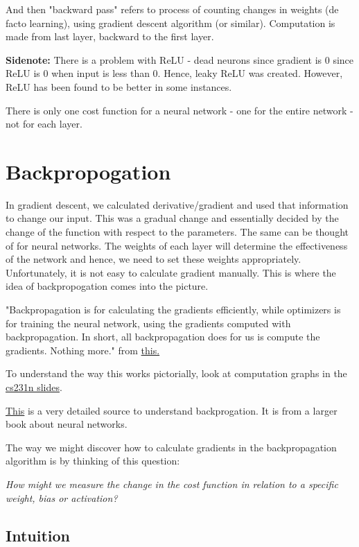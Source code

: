 And then "backward pass" refers to process of counting changes in weights (de facto learning), using gradient descent algorithm (or similar). Computation is made from last layer, backward to the first layer.

\textbf{Sidenote:} There is a problem with ReLU - dead neurons since gradient is 0 since ReLU is 0 when input is less than 0. Hence, leaky ReLU was created. However, ReLU has been found to be better in some instances.

There is only one cost function for a neural network - one for the entire network - not for each layer.

\section{Backpropogation}

In gradient descent, we calculated derivative/gradient and used that information to change our input. This was a gradual change and essentially decided by the change of the function with respect to the parameters. The same can be thought of for neural networks. The weights of each layer will determine the effectiveness of the network and hence, we need to set these weights appropriately. Unfortunately, it is not easy to calculate gradient manually. This is where the idea of backpropogation comes into the picture. 

"Backpropagation is for calculating the gradients efficiently, while optimizers is for training the neural network, using the gradients computed with backpropagation. In short, all backpropagation does for us is compute the gradients. Nothing more." from \href{https://mlfromscratch.com/neural-networks-explained/#/}{this.}

To understand the way this works pictorially, look at computation graphs in the \href{http://cs231n.stanford.edu/slides/2020/lecture_4.pdf}{cs231n slides}.

\href{http://neuralnetworksanddeeplearning.com/chap2.html}{This} is a very detailed source to understand backprogation. It is from a larger book about neural networks.

The way we might discover how to calculate gradients in the backpropagation algorithm is by thinking of this question:

\textit{How might we measure the change in the cost function in relation to a specific weight, bias or activation?}

\subsection{Intuition}

